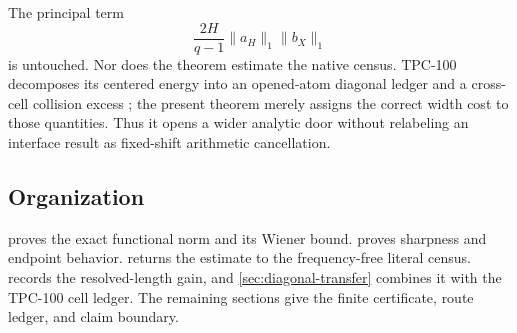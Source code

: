 The principal term
\[
 \frac{2H}{q-1}\|a_H\|_1\|b_X\|_1
\]
is untouched.  Nor does the theorem estimate the native census.
TPC-100 decomposes its centered energy into an opened-atom diagonal
ledger and a cross-cell collision excess
\citep{WangTPC100}; the present theorem merely assigns the correct
width cost to those quantities.  Thus it opens a wider analytic
door without relabeling an interface result as fixed-shift
arithmetic cancellation.

\subsection{Organization}

 proves the exact functional norm and its
Wiener bound.   proves sharpness and endpoint
behavior.   returns the estimate to the
frequency-free literal census.   records
the resolved-length gain, and \cref{sec:diagonal-transfer} combines
it with the TPC-100 cell ledger.  The remaining sections give the
finite certificate, route ledger, and claim boundary.
